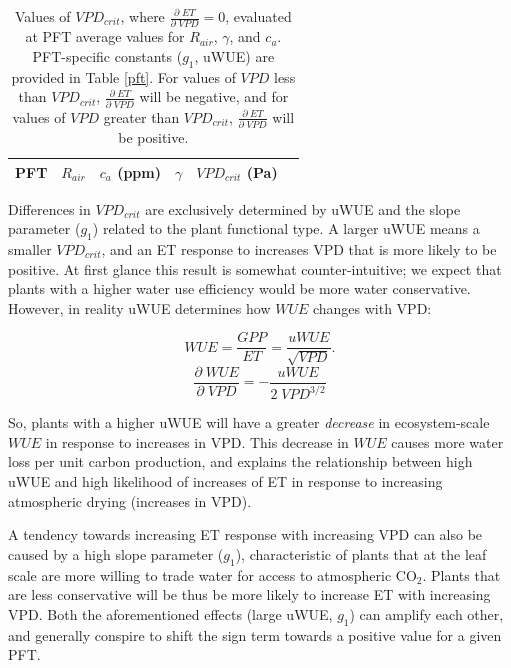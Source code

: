 \documentclass[draft,linenumbers]{agujournal}
\begin{document}
\begin{table}  
\caption{Values of $VPD_{crit}$, where $\frac{\partial \; ET}{\partial \; VPD} = 0$, evaluated at PFT average values for $R_{air}$, $\gamma$, and $c_a$. PFT-specific constants ($g_1$, uWUE) are provided in Table \ref{pft}. For values of $VPD$ less than $VPD_{crit}$, $\frac{\partial \; ET}{\partial \; VPD}$ will be negative, and for values of $VPD$ greater than $VPD_{crit}$, $\frac{\partial \; ET}{\partial \; VPD}$ will be positive.}
\centering
\begin{tabular}{l c c c c c}
  \hline
  PFT & $R_{air}$ & $c_a$ (ppm) & $\gamma$  & \textbf{$VPD_{crit}$ (Pa)} \\
  \hline
  
\hline
\end{tabular}
\label{vpd_crit}
\end{table}


Differences in $VPD_{crit}$ are exclusively determined by uWUE and the slope parameter ($g_1$) related to the plant functional type. A larger uWUE means a smaller $VPD_{crit}$, and an ET response to increases VPD that is more likely to be positive. At first glance this result is somewhat counter-intuitive; we expect that plants with a higher water use efficiency would be more water conservative. However, in reality uWUE determines how $WUE$ changes with VPD:

\[WUE = \frac{GPP}{ET} = \frac{uWUE}{\sqrt{VPD}}.\]
\[\frac{\partial \; WUE}{\partial \; VPD} = -\frac{uWUE}{2 \; VPD^{3/2}}\]

So, plants with a higher uWUE will have a greater \textit{decrease} in ecosystem-scale $WUE$ in response to increases in VPD. This decrease in $WUE$ causes more water loss per unit carbon production, and explains the relationship between high uWUE and high likelihood of increases of ET in response to increasing atmospheric drying (increases in VPD).

A tendency towards increasing ET response with increasing VPD can also be caused by a high slope parameter ($g_1$), characteristic of plants that at the leaf scale are more willing to trade water for access to atmospheric CO$_2$. Plants that are less conservative will be thus be more likely to increase ET with increasing VPD. Both the aforementioned effects (large uWUE, $g_1$) can amplify each other, and generally conspire to shift the sign term towards a positive value for a given PFT.
\end{document}
